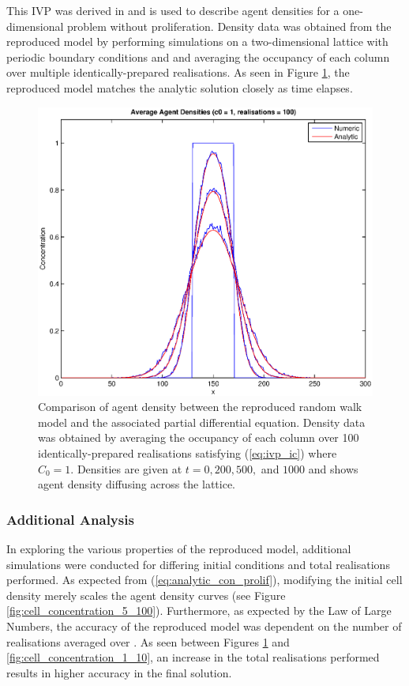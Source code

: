 \documentclass[11pt,a4paper]{article}
\begin{document}
		This IVP was derived in \cite{simpson2009diffusing} and is used to describe agent densities for a one-dimensional problem without proliferation. Density data was obtained from the reproduced model by performing simulations on a two-dimensional lattice with periodic boundary conditions and and averaging the occupancy of each column over multiple identically-prepared realisations. As seen in Figure \ref{fig:cell_concentration_1_100}, the reproduced model matches the analytic solution closely as time elapses.

		\begin{figure}[tbh]
			\centering
				\includegraphics[width=\textwidth]{./Figures/cell_concentration_1_100.eps}
			\caption{Comparison of agent density between the reproduced random walk model and the associated partial differential equation. Density data was obtained by averaging the occupancy of each column over 100 identically-prepared realisations satisfying (\ref{eq:ivp_ic}) where $C_0 = 1$. Densities are given at $t = 0, 200, 500,$ and $1000$ and shows agent density diffusing across the lattice.}
			\label{fig:cell_concentration_1_100}
		\end{figure}

		\subsubsection{Additional Analysis}
			\label{subs:additionalanalysis}
			
			In exploring the various properties of the reproduced model, additional simulations were conducted for differing initial conditions and total realisations performed. As expected from (\ref{eq:analytic_con_prolif}), modifying the initial cell density merely scales the agent density curves (see Figure \ref{fig:cell_concentration_5_100}). Furthermore, as expected by the Law of Large Numbers, the accuracy of the reproduced model was dependent on the number of realisations averaged over \cite{lawlargenum}. As seen between Figures \ref{fig:cell_concentration_1_100} and \ref{fig:cell_concentration_1_10}, an increase in the total realisations performed results in higher accuracy in the final solution.
		
\end{document}
